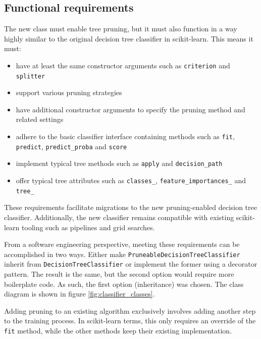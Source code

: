 \subsection{Functional requirements}
The new class must enable tree pruning, but it must also function in a way highly similar to the original decision tree classifier in scikit-learn. This means it must:
\begin{itemize}
    \item have at least the same constructor arguments such as \texttt{criterion} and \texttt{splitter}
    \item support various pruning strategies
    \item have additional constructor arguments to specify the pruning method and related settings
    \item adhere to the basic classifier interface containing methods such as \texttt{fit}, \texttt{predict}, \texttt{predict\_proba} and \texttt{score}
    \item implement typical tree methods such as \texttt{apply} and \texttt{decision\_path}
    \item offer typical tree attributes such as \texttt{classes\_}, \texttt{feature\_importances\_} and \texttt{tree\_}
\end{itemize}

These requirements facilitate migrations to the new pruning-enabled decision tree classifier. Additionally, the new classifier remains compatible with existing scikit-learn tooling such as pipelines and grid searches.

From a software engineering perspective, meeting these requirements can be accomplished in two ways. Either make \texttt{PruneableDecisionTreeClassifier} inherit from \texttt{DecisionTreeClassifier} or implement the former using a decorator pattern. The result is the same, but the second option would require more boilerplate code. As such, the first option (inheritance) was chosen. The class diagram is shown in figure \ref{fig:classifier_classes}.

Adding pruning to an existing algorithm exclusively involves adding another step to the training process. In scikit-learn terms, this only requires an override of the \texttt{fit} method, while the other methods keep their existing implementation.

